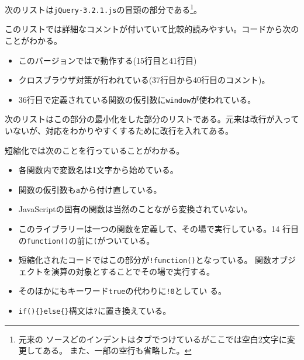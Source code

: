 次のリストは\texttt{jQuery-3.2.1.js}の冒頭の部分である\footnote{元来の
ソースどのインデントはタブでつけているがここでは空白2文字に変更してある。
また、一部の空行も省略した。}。

このリストでは詳細なコメントが付いていて比較的読みやすい。コードから次の
ことがわかる。
\begin{itemize}
 \item このバージョンでは\Strict で動作する(15行目と41行目)
 \item クロスブラウザ対策が行われている(37行目から40行目のコメント)。
 \item 36行目で定義されている関数の仮引数に\Verb+window+が使われている。
\end{itemize}
次のリストはこの部分の最小化をした部分のリストである。元来は改行が入って
いないが、対応をわかりやすくするために改行を入れてある。


短縮化では次のことを行っていることがわかる。
\begin{itemize}
 \item 各関数内で変数名は1文字から始めている。
 \item 関数の仮引数も\texttt{a}から付け直している。
 \item JavaScriptの固有の関数は当然のことながら変換されていない。
 \item このライブラリーは一つの関数を定義して、その場で実行している。14
       行目の\texttt{function()}の前に\texttt{(}がついている。
 \item 短縮化されたコードではこの部分が\texttt{!function()}となっている。
       関数オブジェクトを演算の対象とすることでその場で実行する。
 \item そのほかにもキーワード\texttt{true}の代わりに\texttt{!0}としてい
       る。
 \item \texttt{if()\{\}else\{\}}構文は\texttt{?}に置き換えている。
\end{itemize}
